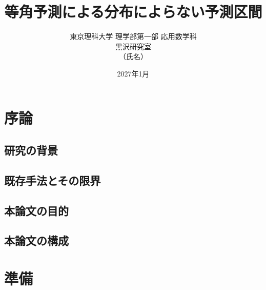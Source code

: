 \documentclass[a4paper,11pt]{jsarticle}
\title{等角予測による分布によらない予測区間}
\author{東京理科大学 理学部第一部 応用数学科\\ 黒沢研究室\\ （氏名）}
\date{2027年1月}
\theoremstyle{definition}
\theoremstyle{plain}
\theoremstyle{remark}
\begin{document}
\maketitle

\begin{abstract}
\end{abstract}

\tableofcontents
\newpage

\section{序論}

\subsection{研究の背景}

\subsection{既存手法とその限界}

\subsection{本論文の目的}

\subsection{本論文の構成}

\section{準備}
\end{document}
